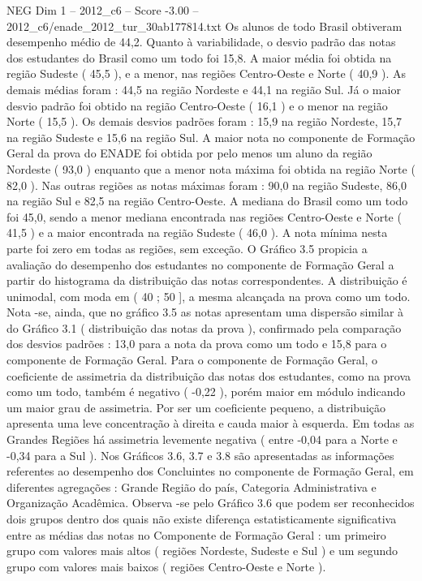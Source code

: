 \begin{textsample}{NEG Dim 1 – 2012\_c6 – Score -3.00 – 2012\_c6/enade\_2012\_tur\_30ab177814.txt}
Os alunos de todo Brasil obtiveram desempenho médio de 44,2.
Quanto à variabilidade, o desvio padrão das notas dos estudantes do Brasil como um todo foi 15,8.
A maior média foi obtida na região Sudeste ( 45,5 ), e a menor, nas regiões Centro-Oeste e Norte ( 40,9 ).
As demais médias foram : 44,5 na região Nordeste e 44,1 na região Sul.
Já o maior desvio padrão foi obtido na região Centro-Oeste ( 16,1 ) e o menor na região Norte ( 15,5 ).
Os demais desvios padrões foram : 15,9 na região Nordeste, 15,7 na região Sudeste e 15,6 na região Sul.
A maior nota no componente de Formação Geral da prova do ENADE foi obtida por pelo menos um aluno da região Nordeste ( 93,0 ) enquanto que a menor nota máxima foi obtida na região Norte ( 82,0 ).
Nas outras regiões as notas máximas foram : 90,0 na região Sudeste, 86,0 na região Sul e 82,5 na região Centro-Oeste.
A mediana do Brasil como um todo foi 45,0, sendo a menor mediana encontrada nas regiões Centro-Oeste e Norte ( 41,5 ) e a maior encontrada na região Sudeste ( 46,0 ).
A nota mínima nesta parte foi zero em todas as regiões, sem exceção.
O Gráfico 3.5 propicia a avaliação do desempenho dos estudantes no componente de Formação Geral a partir do histograma da distribuição das notas correspondentes.
A distribuição é unimodal, com moda em ( 40 ; 50 ], a mesma alcançada na prova como um todo.
Nota -se, ainda, que no gráfico 3.5 as notas apresentam uma dispersão similar à do Gráfico 3.1 ( distribuição das notas da prova ), confirmado pela comparação dos desvios padrões : 13,0 para a nota da prova como um todo e 15,8 para o componente de Formação Geral.
Para o componente de Formação Geral, o coeficiente de assimetria da distribuição das notas dos estudantes, como na prova como um todo, também é negativo ( -0,22 ), porém maior em módulo indicando um maior grau de assimetria.
Por ser um coeficiente pequeno, a distribuição apresenta uma leve concentração à direita e cauda maior à esquerda.
Em todas as Grandes Regiões há assimetria levemente negativa ( entre -0,04 para a Norte e -0,34 para a Sul ).
Nos Gráficos 3.6, 3.7 e 3.8 são apresentadas as informações referentes ao desempenho dos Concluintes no componente de Formação Geral, em diferentes agregações : Grande Região do país, Categoria Administrativa e Organização Acadêmica.
Observa -se pelo Gráfico 3.6 que podem ser reconhecidos dois grupos dentro dos quais não existe diferença estatisticamente significativa entre as médias das notas no Componente de Formação Geral : um primeiro grupo com valores mais altos ( regiões Nordeste, Sudeste e Sul ) e um segundo grupo com valores mais baixos ( regiões Centro-Oeste e Norte ).

\end{textsample}

